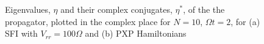 \begin{figure}
  \centering
  \caption{Eigenvalues, $\eta$ and their complex conjugates, $\eta^*$,
    of the the propagator, plotted in the complex place for $N=10$,
    $\Omega t=2$, for (a) SFI with $V_{rr}=100\Omega$ and (b) PXP
    Hamiltonians}
\end{figure}


